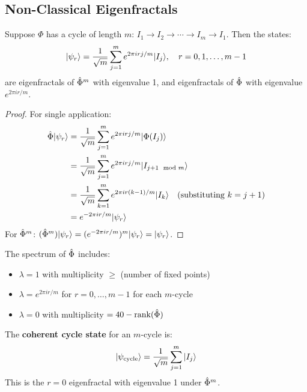 \subsection{Non-Classical Eigenfractals}

\begin{theorem}
\label{thm:cycle-eigenfractals}
Suppose $\Phi$ has a cycle of length $m$: $I_1 \to I_2 \to \cdots \to I_m \to I_1$. Then the states:
\[
|\psi_r\rangle = \frac{1}{\sqrt{m}} \sum_{j=1}^{m} e^{2\pi i r j / m} |I_j\rangle, \quad r = 0, 1, \ldots, m-1
\]
are eigenfractals of $\hat{\Phi}^m$ with eigenvalue 1, and eigenfractals of $\hat{\Phi}$ with eigenvalue $e^{2\pi i r / m}$.
\end{theorem}

\begin{proof}
For single application:
\begin{align*}
\hat{\Phi}|\psi_r\rangle &= \frac{1}{\sqrt{m}} \sum_{j=1}^{m} e^{2\pi i r j / m} |\Phi(I_j)\rangle \\
&= \frac{1}{\sqrt{m}} \sum_{j=1}^{m} e^{2\pi i r j / m} |I_{j+1 \mod m}\rangle \\
&= \frac{1}{\sqrt{m}} \sum_{k=1}^{m} e^{2\pi i r (k-1) / m} |I_k\rangle \quad (\text{substituting } k = j+1) \\
&= e^{-2\pi i r / m} |\psi_r\rangle
\end{align*}
For $\hat{\Phi}^m$: $(\hat{\Phi}^m)|\psi_r\rangle = (e^{-2\pi i r / m})^m |\psi_r\rangle = |\psi_r\rangle$.
\end{proof}

\begin{corollary}
\label{cor:spectrum-cycles}
The spectrum of $\hat{\Phi}$ includes:
\begin{itemize}
  \item $\lambda = 1$ with multiplicity $\geq$ (number of fixed points)
  \item $\lambda = e^{2\pi i r / m}$ for $r = 0, \ldots, m-1$ for each $m$-cycle
  \item $\lambda = 0$ with multiplicity $= 40 - \mathrm{rank}(\hat{\Phi})$
\end{itemize}
\end{corollary}

\begin{definition}
\label{def:coherent-cycle}
The \textbf{coherent cycle state} for an $m$-cycle is:
\[
|\psi_{\mathrm{cycle}}\rangle = \frac{1}{\sqrt{m}} \sum_{j=1}^{m} |I_j\rangle
\]
This is the $r = 0$ eigenfractal with eigenvalue 1 under $\hat{\Phi}^m$.
\end{definition}

